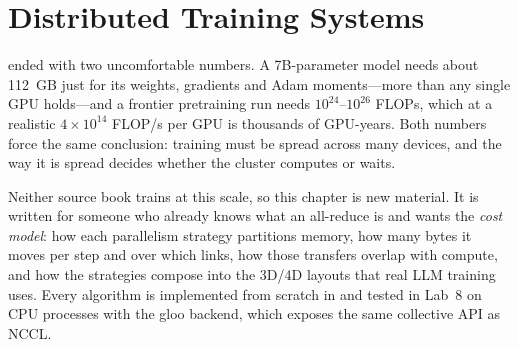 \chapter{Distributed Training Systems}\label{ch:distributed}

 ended with two uncomfortable numbers. A 7B-parameter model needs about
\SI{112}{GB} just for its weights, gradients and Adam moments---more than any single GPU holds---and
a frontier pretraining run needs $10^{24}$--$10^{26}$ FLOPs, which at a realistic
$4\times10^{14}$ FLOP/s per GPU is thousands of GPU-years. Both numbers force the same
conclusion: training must be spread across many devices, and the way it is spread decides
whether the cluster computes or waits.

Neither source book trains at this scale, so this chapter is new material. It is written for
someone who already knows what an all-reduce is and wants the \emph{cost model}: how each
parallelism strategy partitions memory, how many bytes it moves per step and over which links,
how those transfers overlap with compute, and how the strategies compose into the 3D/4D
layouts that real LLM training uses. Every algorithm is implemented from scratch in
 and tested in Lab~8 on CPU processes with the gloo backend, which exposes the
same collective API as NCCL.

